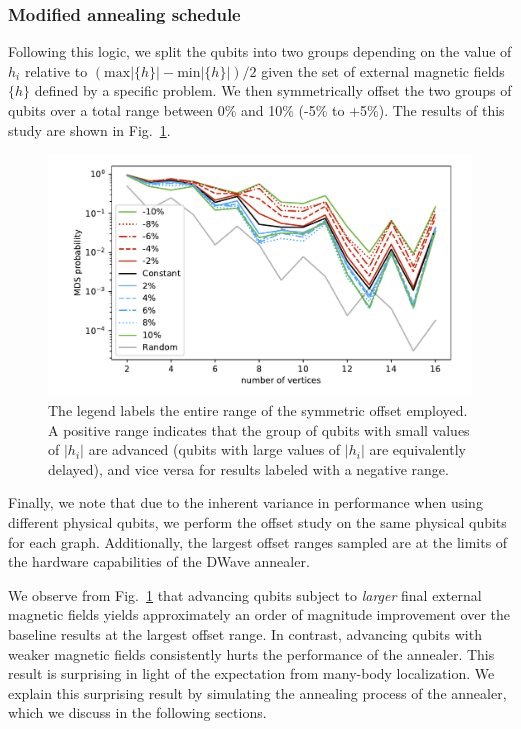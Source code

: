 \documentclass[prd,twocolumn,tightenlines,preprintnumbers,showpacs,superscriptaddress,notitlepage,nofootinbib,eqsecnum,floatfix,longbibliography]{revtex4}
\begin{document}
\subsubsection{Modified annealing schedule}

Following this logic, we split the qubits into two groups depending on the value of $h_i$ relative to $(\textrm{max}|\{h\}| - \textrm{min}|\{h\}|) / 2$ given the set of external magnetic fields $\{h\}$ defined by a specific problem.
We then symmetrically offset the two groups of qubits over a total range between 0\% and 10\% (-5\% to +5\%).
The results of this study are shown in Fig.~\ref{fig:dwave_offset}.

\begin{figure}[b]
    \centering
    \includegraphics[width=\columnwidth]{./figures/scaling_comparison_all.pdf}
    \caption{The legend labels the entire range of the symmetric offset employed.
A positive range indicates that the group of qubits with small values of $|h_i|$ are advanced (qubits with large values of $|h_i|$ are equivalently delayed), and vice versa for results labeled with a negative range.}
    \label{fig:dwave_offset}
\end{figure}

Finally, we note that due to the inherent variance in performance when using different physical qubits, we perform the offset study on the same physical qubits for each graph.
Additionally, the largest offset ranges sampled are at the limits of the hardware capabilities of the DWave annealer.

We observe from Fig.~\ref{fig:dwave_offset} that advancing qubits subject to \textit{larger} final external magnetic fields yields approximately an order of magnitude improvement over the baseline results at the largest offset range.
In contrast, advancing qubits with weaker magnetic fields consistently hurts the performance of the annealer.
This result is surprising in light of the expectation from many-body localization.
We explain this surprising result by simulating the annealing process of the annealer, which we discuss in the following sections.
\end{document}
